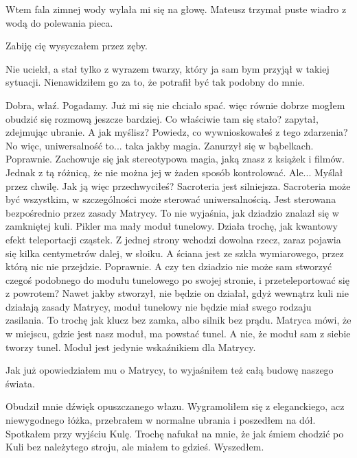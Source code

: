 Wtem fala zimnej wody wylała mi się na głowę. 
Mateusz trzymał puste wiadro z wodą do polewania pieca.
\begin{dialogue}
\ds{} Zabiję cię \dm{} wysyczałem przez zęby.
\end{dialogue}
Nie uciekł, a stał tylko z wyrazem twarzy, który ja sam bym przyjął w takiej sytuacji.
Nienawidziłem go za to, że potrafił być tak podobny do mnie.
\begin{dialogue}
\ds{} Dobra, właź. Pogadamy. \dm{} Już mi się nie chciało spać. więc równie dobrze mogłem obudzić się rozmową jeszcze bardziej.
\ds{} Co właściwie tam się stało? \dm{} zapytał, zdejmując ubranie.
\ds{} A jak myślisz? Powiedz, co wywnioskowałeś z tego zdarzenia?
\ds{} No więc, uniwersalność to... taka jakby magia. \dm{} Zanurzył się w bąbelkach.
\ds{} Poprawnie. Zachowuje się jak stereotypowa magia, jaką znasz z książek i filmów. Jednak z tą różnicą, że nie można jej w żaden sposób kontrolować.
\ds{} Ale... \dm{} Myślał przez chwilę. \dm{} Jak ją więc przechwyciłeś?
\ds{} Sacroteria jest silniejsza. Sacroteria może być wszystkim, w szczególności może sterować uniwersalnością. Jest sterowana bezpośrednio przez zasady Matrycy.
\ds{} To nie wyjaśnia, jak dziadzio znalazł się w zamkniętej kuli.
\ds{} Pikler ma mały moduł tunelowy. Działa trochę, jak kwantowy efekt teleportacji cząstek. Z jednej strony wchodzi dowolna rzecz, zaraz pojawia się kilka centymetrów dalej, w słoiku.
\ds{} A ściana jest ze szkła wymiarowego, przez którą nic nie przejdzie.
\ds{} Poprawnie.
\ds{} A czy ten dziadzio nie może sam stworzyć czegoś podobnego do modułu tunelowego po swojej stronie, i przeteleportować się z powrotem?
\ds{} Nawet jakby stworzył, nie będzie on działał, gdyż wewnątrz kuli nie działają zasady Matrycy, moduł tunelowy nie będzie miał swego rodzaju zasilania.
To trochę jak klucz bez zamka, albo silnik bez prądu. Matryca mówi, że w miejscu, gdzie jest nasz moduł, ma powstać tunel. A nie, że moduł sam z siebie tworzy tunel. Moduł jest jedynie wskaźnikiem dla Matrycy.
\end{dialogue}
Jak już opowiedziałem mu o Matrycy, to wyjaśniłem też całą budowę naszego świata.


Obudził mnie dźwięk opuszczanego włazu.
Wygramoliłem się z eleganckiego, acz niewygodnego łóżka, przebrałem w normalne ubrania i poszedłem na dół.
Spotkałem przy wyjściu Kulę.
Trochę nafukał na mnie, że jak śmiem chodzić po Kuli bez należytego stroju, ale miałem to gdzieś.
Wyszedłem.

